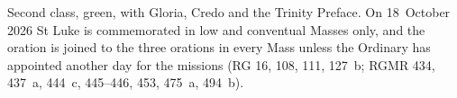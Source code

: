 \vspace{0.1em}
{\footnotesize\noindent Second class, green, with Gloria, Credo and the Trinity
Preface. On 18~October 2026 St Luke is commemorated in low and conventual Masses
only, and the oration  is joined to the three
orations in every Mass unless the Ordinary has appointed another day for the
missions (RG 16, 108, 111, 127~b; RGMR 434, 437~a, 444~c, 445--446, 453, 475~a,
494~b).\par}
